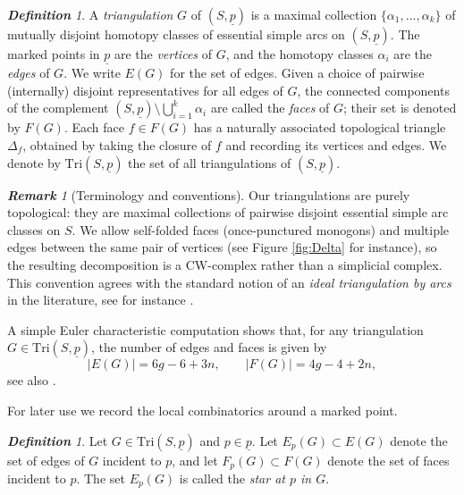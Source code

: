 \documentclass[11pt, letterpaper]{amsart}
\theoremstyle{definition}
\theoremstyle{remark}
\newtheorem{definition}[theorem]{\rm\bf Definition}
\newtheorem{remark}[theorem]{\rm\bf Remark}
\newcommand{\up}{\underline{p}}
\newcommand{\Sp}{(S,\up)}
\newcommand{\TSp}{\text{Tri}\Sp}
\newcommand{\DEF}{} \newcommand{\WARN}{\textcolor{red}} \newcommand{\ALT}{\textcolor{brown}} \newcommand{\TODO}{\textcolor{teal}} %
\numberwithin{equation}{section}
\begin{document}
\begin{definition}
\label{def:triangulation}
A \DEF{\em triangulation} \(G\) of \(\Sp\) is a maximal collection \(\{ \alpha_1, \dots, \alpha_k \}\) of mutually disjoint homotopy classes of essential simple arcs on \(\Sp\). The marked points in \(\up\) are the \DEF{\em vertices} of \(G\), and the homotopy classes \(\alpha_i\) are the \DEF{\em edges} of \(G\).
We write \(E(G)\) for the set of edges.
Given a choice of pairwise (internally) disjoint representatives for all edges of \(G\), the connected components of the complement
\(  \Sp \setminus \bigcup_{i=1}^k \alpha_i \)
are called the \DEF{\em faces} of \(G\); their set is denoted by \(F(G)\).
Each face \(f \in F(G)\) has a naturally associated topological triangle \(\Delta_f\), obtained by taking the closure of \(f\) and recording its vertices and edges.
We denote by \(\TSp\) the set of all triangulations of \(\Sp\).
\end{definition}







\begin{remark}[Terminology and conventions]
Our triangulations are purely topological: they are maximal collections of pairwise disjoint essential simple arc classes on \(S\). We allow self-folded faces (once-punctured monogons) and multiple edges between the same pair of vertices (see Figure \ref{fig:Delta} for instance), so the resulting decomposition is a CW-complex rather than a simplicial complex.
This convention agrees with the standard notion of an \emph{ideal triangulation by arcs} in the literature, see for instance \cite{Pen87, FST08}.
\end{remark}





A simple Euler characteristic computation shows that, for any triangulation \(G \in \TSp\), the number of edges and faces is given by
\[
  \lvert E(G) \rvert = 6g - 6 + 3n, \qquad
  \lvert F(G) \rvert = 4g - 4 + 2n,
\]
see also \cite[Prop.~2.10]{FST08}.



For later use we record the local combinatorics around a marked point.

\begin{definition}
\label{def:face.star}
Let \(G \in \TSp\) and \(p \in \up\).
Let \(E_p(G) \subset E(G)\) denote the set of edges of \(G\) incident to \(p\), and let \(F_p(G) \subset F(G)\) denote the set of faces incident to \(p\).
The set \(E_p(G)\) is called the \DEF{\em star at \(p\) in \(G\)}.
\end{definition}
\end{document}
